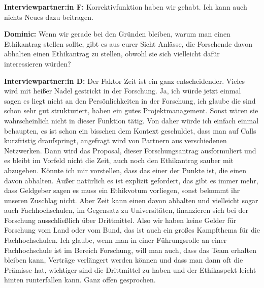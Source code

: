 \documentclass[a4paper,12pt,twoside]{scrreprt}
\begin{document}
\textbf{Interviewpartner:in F:} Korrektivfunktion haben wir gehabt. Ich kann auch nichts Neues dazu beitragen.

\textbf{Dominic:} Wenn wir gerade bei den Gründen bleiben, warum man einen Ethikantrag stellen sollte, gibt es aus eurer Sicht Anlässe, die Forschende davon abhalten einen Ethikantrag zu stellen, obwohl sie sich vielleicht dafür interessieren würden?

\textbf{Interviewpartner:in D:} Der Faktor Zeit ist ein ganz entscheidender. Vieles wird mit heißer Nadel gestrickt in der Forschung. Ja, ich würde jetzt einmal sagen es liegt nicht an den Persönlichkeiten in der Forschung, ich glaube die sind schon sehr gut strukturiert, haben ein gutes Projektmanagement. Sonst wären sie wahrscheinlich nicht in dieser Funktion tätig. Von daher würde ich einfach einmal behaupten, es ist schon ein bisschen dem Kontext geschuldet, dass man auf Calls kurzfristig draufspringt, angefragt wird von Partnern aus verschiedenen Netzwerken. Dann wird das Proposal, dieser Forschungsantrag ausformuliert und es bleibt im Vorfeld nicht die Zeit, auch noch den Ethikantrag sauber mit abzugeben. Könnte ich mir vorstellen, dass das einer der Punkte ist, die einen davon abhalten. Außer natürlich es ist explizit gefordert, das gibt es immer mehr, dass Geldgeber sagen es muss ein Ethikvotum vorliegen, sonst bekommt ihr unseren Zuschlag nicht. Aber Zeit kann einen davon abhalten und vielleicht sogar auch Fachhochschulen, im Gegensatz zu Universitäten, finanzieren sich bei der Forschung ausschließlich über Drittmittel. Also wir haben keine Gelder für Forschung vom Land oder vom Bund, das ist auch ein großes Kampfthema für die Fachhochschulen. Ich glaube, wenn man in einer Führungsrolle an einer Fachhochschule ist im Bereich Forschung, will man auch, dass das Team erhalten bleiben kann, Verträge verlängert werden können und dass man dann oft die Prämisse hat, wichtiger sind die Drittmittel zu haben und der Ethikaspekt leicht hinten runterfallen kann. Ganz offen gesprochen.
\end{document}
